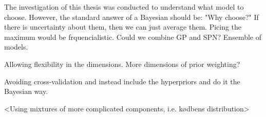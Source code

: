 The investigation of this thesis was conducted to understand what model to choose. However, the standard answer
of a Bayesian should be: "Why choose?" If there is uncertainty about them, then we can just average
them. Picing the maximum would be frquencialistic. Could we combine GP and SPN? Ensemble of models.

Allowing flexibility in the dimensions. 
More dimensions of prior weighting?

Avoiding cross-validation and instead include the hyperpriors and do it the Bayesian way. 

<Using mixtures of more complicated components, i.e. kødbens distribution>


